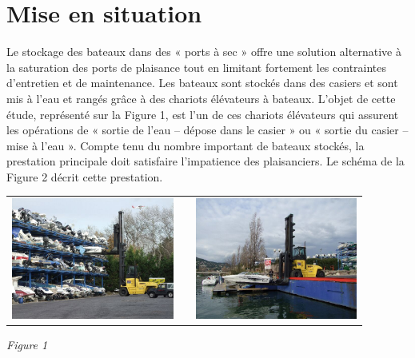 \documentclass[10pt,fleqn]{article} %
\begin{document}

\vspace{7cm}
\pagestyle{fancy}
\thispagestyle{plain}

\def\columnseprulecolor{\color{ocre}}
\setlength{\columnseprule}{0.4pt} 


\section*{Mise en situation}

Le stockage des bateaux dans des « ports à sec » offre une solution alternative à la saturation des ports de plaisance tout en limitant fortement les contraintes d’entretien et de maintenance. Les bateaux sont stockés dans des casiers et sont mis à l’eau et rangés grâce à des chariots élévateurs à bateaux. L’objet de cette étude, représenté sur la Figure 1, est l’un de ces chariots élévateurs qui assurent les opérations de « sortie de l’eau -- dépose dans le casier » ou « sortie du casier -- mise à l’eau ». Compte tenu du nombre important de bateaux stockés, la prestation principale doit satisfaire l’impatience des plaisanciers. Le schéma de la Figure 2 décrit cette prestation.

\begin{center}
\begin{tabular}{ccc}
\includegraphics[height=4cm]{images/fig_01_a} &&
\includegraphics[height=4cm]{images/fig_01_b}
\end{tabular}

\textit{Figure 1}
\end{center}
\end{document}
